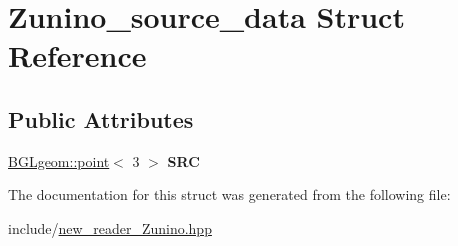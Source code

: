 \hypertarget{structZunino__source__data}{
\section{Zunino\_\-source\_\-data Struct Reference}
\label{structZunino__source__data}
}
\subsection*{Public Attributes}
\begin{DoxyCompactItemize}
\item 
\hypertarget{structZunino__source__data_a6dfd3bca7be19875015816dde7d6228f}{
\hyperlink{classBGLgeom_1_1point}{BGLgeom::point}$<$ 3 $>$ {\bfseries SRC}}
\label{structZunino__source__data_a6dfd3bca7be19875015816dde7d6228f}

\end{DoxyCompactItemize}


The documentation for this struct was generated from the following file:\begin{DoxyCompactItemize}
\item 
include/\hyperlink{new__reader__Zunino_8hpp}{new\_\-reader\_\-Zunino.hpp}\end{DoxyCompactItemize}

